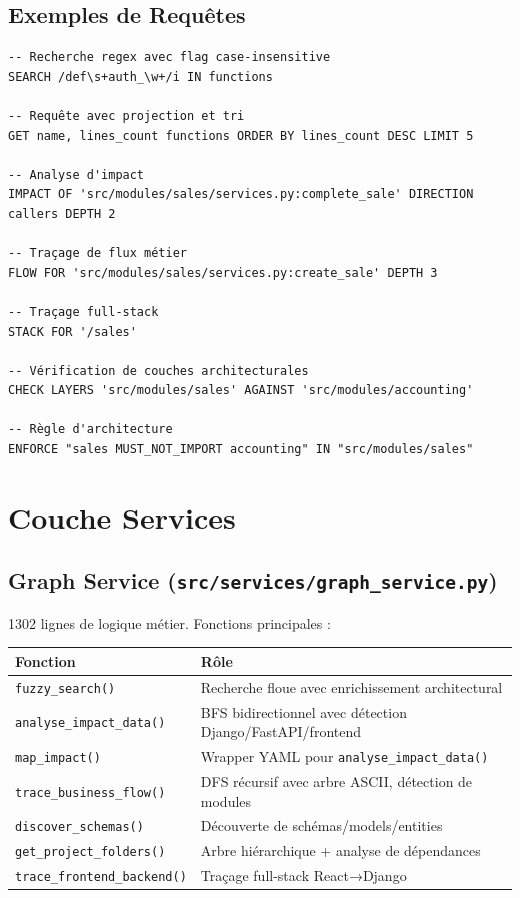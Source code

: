 \documentclass[12pt,a4paper]{article}
\newcommand{\code}[1]{\texttt{#1}}
\begin{document}
\subsection{Exemples de Requêtes}

\begin{lstlisting}
-- Recherche regex avec flag case-insensitive
SEARCH /def\s+auth_\w+/i IN functions

-- Requête avec projection et tri
GET name, lines_count functions ORDER BY lines_count DESC LIMIT 5

-- Analyse d'impact
IMPACT OF 'src/modules/sales/services.py:complete_sale' DIRECTION callers DEPTH 2

-- Traçage de flux métier
FLOW FOR 'src/modules/sales/services.py:create_sale' DEPTH 3

-- Traçage full-stack
STACK FOR '/sales'

-- Vérification de couches architecturales
CHECK LAYERS 'src/modules/sales' AGAINST 'src/modules/accounting'

-- Règle d'architecture
ENFORCE "sales MUST_NOT_IMPORT accounting" IN "src/modules/sales"
\end{lstlisting}

\section{Couche Services}

\subsection{Graph Service (\code{src/services/graph\_service.py})}

1302 lignes de logique métier. Fonctions principales :

\begin{center}
\begin{tabularx}{\textwidth}{lX}
\toprule
\textbf{Fonction} & \textbf{Rôle} \\
\midrule
\code{fuzzy\_search()} & Recherche floue avec enrichissement architectural \\
\code{analyse\_impact\_data()} & BFS bidirectionnel avec détection Django/FastAPI/frontend \\
\code{map\_impact()} & Wrapper YAML pour \code{analyse\_impact\_data()} \\
\code{trace\_business\_flow()} & DFS récursif avec arbre ASCII, détection de modules \\
\code{discover\_schemas()} & Découverte de schémas/models/entities \\
\code{get\_project\_folders()} & Arbre hiérarchique + analyse de dépendances \\
\code{trace\_frontend\_backend()} & Traçage full-stack React→Django \\
\bottomrule
\end{tabularx}
\end{center}
\end{document}
